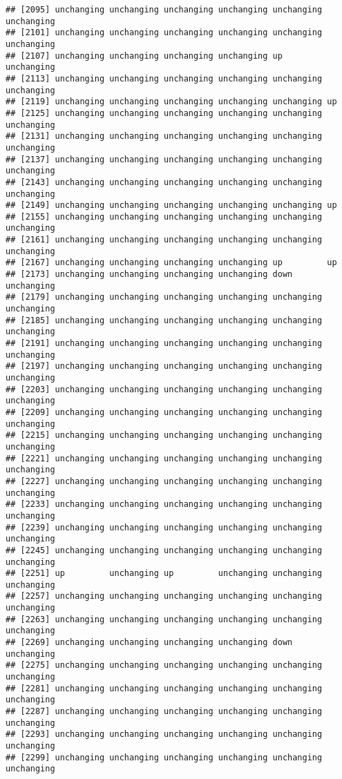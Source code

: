 \documentclass[]{article}
\begin{document}
\begin{verbatim}
## [2095] unchanging unchanging unchanging unchanging unchanging unchanging
## [2101] unchanging unchanging unchanging unchanging unchanging unchanging
## [2107] unchanging unchanging unchanging unchanging up         unchanging
## [2113] unchanging unchanging unchanging unchanging unchanging unchanging
## [2119] unchanging unchanging unchanging unchanging unchanging up        
## [2125] unchanging unchanging unchanging unchanging unchanging unchanging
## [2131] unchanging unchanging unchanging unchanging unchanging unchanging
## [2137] unchanging unchanging unchanging unchanging unchanging unchanging
## [2143] unchanging unchanging unchanging unchanging unchanging unchanging
## [2149] unchanging unchanging unchanging unchanging unchanging up        
## [2155] unchanging unchanging unchanging unchanging unchanging unchanging
## [2161] unchanging unchanging unchanging unchanging unchanging unchanging
## [2167] unchanging unchanging unchanging unchanging up         up        
## [2173] unchanging unchanging unchanging unchanging down       unchanging
## [2179] unchanging unchanging unchanging unchanging unchanging unchanging
## [2185] unchanging unchanging unchanging unchanging unchanging unchanging
## [2191] unchanging unchanging unchanging unchanging unchanging unchanging
## [2197] unchanging unchanging unchanging unchanging unchanging unchanging
## [2203] unchanging unchanging unchanging unchanging unchanging unchanging
## [2209] unchanging unchanging unchanging unchanging unchanging unchanging
## [2215] unchanging unchanging unchanging unchanging unchanging unchanging
## [2221] unchanging unchanging unchanging unchanging unchanging unchanging
## [2227] unchanging unchanging unchanging unchanging unchanging unchanging
## [2233] unchanging unchanging unchanging unchanging unchanging unchanging
## [2239] unchanging unchanging unchanging unchanging unchanging unchanging
## [2245] unchanging unchanging unchanging unchanging unchanging unchanging
## [2251] up         unchanging up         unchanging unchanging unchanging
## [2257] unchanging unchanging unchanging unchanging unchanging unchanging
## [2263] unchanging unchanging unchanging unchanging unchanging unchanging
## [2269] unchanging unchanging unchanging unchanging down       unchanging
## [2275] unchanging unchanging unchanging unchanging unchanging unchanging
## [2281] unchanging unchanging unchanging unchanging unchanging unchanging
## [2287] unchanging unchanging unchanging unchanging unchanging unchanging
## [2293] unchanging unchanging unchanging unchanging unchanging unchanging
## [2299] unchanging unchanging unchanging unchanging unchanging unchanging

\end{verbatim}
\end{document}

